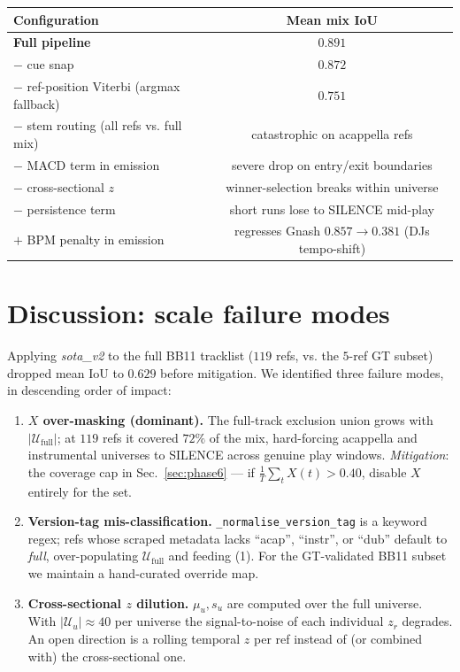 \documentclass[11pt,a4paper]{article}
\begin{document}
\begin{center}
\begin{tabular}{lc}
\toprule
Configuration & Mean mix IoU \\
\midrule
\textbf{Full pipeline} & $\mathbf{0.891}$ \\
$-$ cue snap & $0.872$ \\
$-$ ref-position Viterbi (argmax fallback) & $0.751$ \\
$-$ stem routing (all refs vs. full mix) & catastrophic on acappella refs \\
$-$ MACD term in emission & severe drop on entry/exit boundaries \\
$-$ cross-sectional $z$ & winner-selection breaks within universe \\
$-$ persistence term & short runs lose to SILENCE mid-play \\
$+$ BPM penalty in emission & regresses Gnash $0.857 \to 0.381$ (DJs tempo-shift) \\
\bottomrule
\end{tabular}
\end{center}

\section{Discussion: scale failure modes}

Applying \emph{sota\_v2} to the full BB11 tracklist ($119$ refs, vs. the $5$-ref GT subset) dropped mean IoU to $0.629$ before mitigation. We identified three failure modes, in descending order of impact:

\begin{enumerate}[leftmargin=1.5em, itemsep=0.2em]
\item \textbf{$X$ over-masking (dominant).} The full-track exclusion union grows with $|\mathcal{U}_\text{full}|$; at $119$ refs it covered $72\%$ of the mix, hard-forcing acappella and instrumental universes to SILENCE across genuine play windows. \emph{Mitigation}: the coverage cap in Sec.~\ref{sec:phase6} --- if $\frac{1}{T}\sum_t X(t) > 0.40$, disable $X$ entirely for the set.
\item \textbf{Version-tag mis-classification.} \texttt{\_normalise\_version\_tag} is a keyword regex; refs whose scraped metadata lacks ``acap'', ``instr'', or ``dub'' default to \emph{full}, over-populating $\mathcal{U}_\text{full}$ and feeding (1). For the GT-validated BB11 subset we maintain a hand-curated override map.
\item \textbf{Cross-sectional $z$ dilution.} $\mu_u, s_u$ are computed over the full universe. With $|\mathcal{U}_u| \approx 40$ per universe the signal-to-noise of each individual $z_r$ degrades. An open direction is a rolling temporal $z$ per ref instead of (or combined with) the cross-sectional one.
\end{enumerate}
\end{document}
